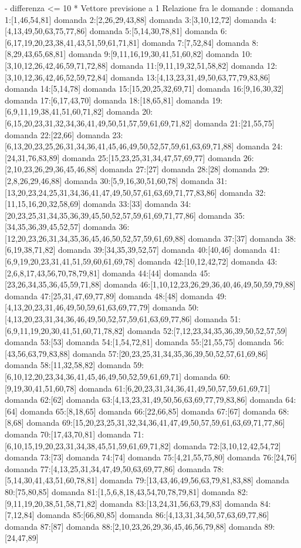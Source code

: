 - differenza <= 10 
* Vettore previsione a 1
Relazione fra le domande :
domanda 1:[1,46,54,81]
domanda 2:[2,26,29,43,88]
domanda 3:[3,10,12,72]
domanda 4:[4,13,49,50,63,75,77,86]
domanda 5:[5,14,30,78,81]
domanda 6:[6,17,19,20,23,38,41,43,51,59,61,71,81]
domanda 7:[7,52,84]
domanda 8:[8,29,43,65,68,81]
domanda 9:[9,11,16,19,30,41,51,60,82]
domanda 10:[3,10,12,26,42,46,59,71,72,88]
domanda 11:[9,11,19,32,51,58,82]
domanda 12:[3,10,12,36,42,46,52,59,72,84]
domanda 13:[4,13,23,31,49,50,63,77,79,83,86]
domanda 14:[5,14,78]
domanda 15:[15,20,25,32,69,71]
domanda 16:[9,16,30,32]
domanda 17:[6,17,43,70]
domanda 18:[18,65,81]
domanda 19:[6,9,11,19,38,41,51,60,71,82]
domanda 20:[6,15,20,23,31,32,34,36,41,49,50,51,57,59,61,69,71,82]
domanda 21:[21,55,75]
domanda 22:[22,66]
domanda 23:[6,13,20,23,25,26,31,34,36,41,45,46,49,50,52,57,59,61,63,69,71,88]
domanda 24:[24,31,76,83,89]
domanda 25:[15,23,25,31,34,47,57,69,77]
domanda 26:[2,10,23,26,29,36,45,46,88]
domanda 27:[27]
domanda 28:[28]
domanda 29:[2,8,26,29,46,88]
domanda 30:[5,9,16,30,51,60,78]
domanda 31:[13,20,23,24,25,31,34,36,41,47,49,50,57,61,63,69,71,77,83,86]
domanda 32:[11,15,16,20,32,58,69]
domanda 33:[33]
domanda 34:[20,23,25,31,34,35,36,39,45,50,52,57,59,61,69,71,77,86]
domanda 35:[34,35,36,39,45,52,57]
domanda 36:[12,20,23,26,31,34,35,36,45,46,50,52,57,59,61,69,88]
domanda 37:[37]
domanda 38:[6,19,38,71,82]
domanda 39:[34,35,39,52,57]
domanda 40:[40,46]
domanda 41:[6,9,19,20,23,31,41,51,59,60,61,69,78]
domanda 42:[10,12,42,72]
domanda 43:[2,6,8,17,43,56,70,78,79,81]
domanda 44:[44]
domanda 45:[23,26,34,35,36,45,59,71,88]
domanda 46:[1,10,12,23,26,29,36,40,46,49,50,59,79,88]
domanda 47:[25,31,47,69,77,89]
domanda 48:[48]
domanda 49:[4,13,20,23,31,46,49,50,59,61,63,69,77,79]
domanda 50:[4,13,20,23,31,34,36,46,49,50,52,57,59,61,63,69,77,86]
domanda 51:[6,9,11,19,20,30,41,51,60,71,78,82]
domanda 52:[7,12,23,34,35,36,39,50,52,57,59]
domanda 53:[53]
domanda 54:[1,54,72,81]
domanda 55:[21,55,75]
domanda 56:[43,56,63,79,83,88]
domanda 57:[20,23,25,31,34,35,36,39,50,52,57,61,69,86]
domanda 58:[11,32,58,82]
domanda 59:[6,10,12,20,23,34,36,41,45,46,49,50,52,59,61,69,71]
domanda 60:[9,19,30,41,51,60,78]
domanda 61:[6,20,23,31,34,36,41,49,50,57,59,61,69,71]
domanda 62:[62]
domanda 63:[4,13,23,31,49,50,56,63,69,77,79,83,86]
domanda 64:[64]
domanda 65:[8,18,65]
domanda 66:[22,66,85]
domanda 67:[67]
domanda 68:[8,68]
domanda 69:[15,20,23,25,31,32,34,36,41,47,49,50,57,59,61,63,69,71,77,86]
domanda 70:[17,43,70,81]
domanda 71:[6,10,15,19,20,23,31,34,38,45,51,59,61,69,71,82]
domanda 72:[3,10,12,42,54,72]
domanda 73:[73]
domanda 74:[74]
domanda 75:[4,21,55,75,80]
domanda 76:[24,76]
domanda 77:[4,13,25,31,34,47,49,50,63,69,77,86]
domanda 78:[5,14,30,41,43,51,60,78,81]
domanda 79:[13,43,46,49,56,63,79,81,83,88]
domanda 80:[75,80,85]
domanda 81:[1,5,6,8,18,43,54,70,78,79,81]
domanda 82:[9,11,19,20,38,51,58,71,82]
domanda 83:[13,24,31,56,63,79,83]
domanda 84:[7,12,84]
domanda 85:[66,80,85]
domanda 86:[4,13,31,34,50,57,63,69,77,86]
domanda 87:[87]
domanda 88:[2,10,23,26,29,36,45,46,56,79,88]
domanda 89:[24,47,89]

